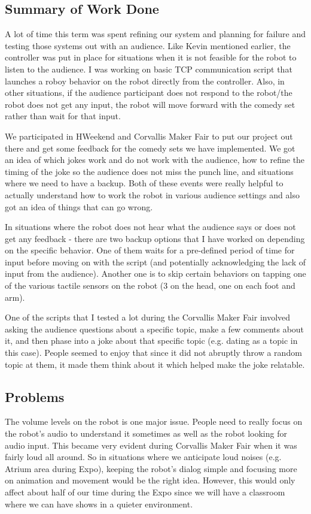 \documentclass[onecolumn, draftclsnofoot,10pt, compsoc]{IEEEtran}
\begin{document}
\subsection{Summary of Work Done}
A lot of time this term was spent refining our system and planning for failure and testing those systems out with an audience. Like Kevin mentioned earlier, the controller was put in place for situations when it is not feasible for the robot to listen to the audience. I was working on basic TCP communication script that launches a roboy behavior on the robot directly from the controller.  Also, in other situations, if the audience participant does not respond to the robot/the robot does not get any input, the robot will move forward with the comedy set rather than wait for that input. 

We participated in HWeekend and Corvallis Maker Fair to put our project out there and get some feedback for the comedy sets we have implemented. We got an idea of which jokes work and do not work with the audience, how to refine the timing of the joke so the audience does not miss the punch line, and situations where we need to have a backup. Both of these events were really helpful to actually understand how to work the robot in various audience settings and also got an idea of things that can go wrong. 

In situations where the robot does not hear what the audience says or does not get any feedback - there are two backup options that I have worked on depending on the specific behavior. One of them waits for a pre-defined period of time for input before moving on with the script (and potentially acknowledging the lack of input from the audience). Another one is to skip certain behaviors on tapping one of the various tactile sensors on the robot (3 on the head, one on each foot and arm).

One of the scripts that I tested a lot during the Corvallis Maker Fair involved asking the audience questions about a specific topic, make a few comments about it, and then phase into a joke about that specific topic (e.g. dating as a topic in this case). People seemed to enjoy that since it did not abruptly throw a random topic at them, it made them think about it which helped make the joke relatable. 

\subsection{Problems}
The volume levels on the robot is one major issue. People need to really focus on the robot's audio to understand it sometimes as well as the robot looking for audio input. This became very evident during Corvallis Maker Fair when it was fairly loud all around. So in situations where we anticipate loud noises (e.g. Atrium area during Expo), keeping the robot's dialog simple and focusing more on animation and movement would be the right idea. However, this would only affect about half of our time during the Expo since we will have a classroom where we can have shows in a quieter environment. 
\end{document}
